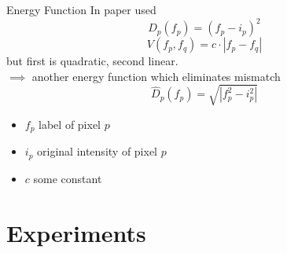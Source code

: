 \documentclass[mathserif]{beamer}
\def\secslide{
    \begin{frame}
        \centering \Huge \secname
    \end{frame}
    \addtocounter{framenumber}{-1}
}
\begin{document}
\begin{frame}{Energy Function}
    In paper used
    \begin{equation}
        D_p(f_p) = (f_p - i_p)^2
    \end{equation}
    \begin{equation}
        V(f_p, f_q) = c\cdot |f_p-f_q| 
    \end{equation}
    but first is quadratic, second linear.\\
    \vspace{0.5cm}
    $\implies$
    another energy function which eliminates mismatch
    \begin{equation}
        \hat D_p(f_p) = \sqrt{|f_p^2 - i_p^2|}
    \end{equation}
    \footnotesize
    \begin{itemize}
        \item[] $f_p$ label of pixel $p$
        \item[] $i_p$ original intensity of pixel $p$
        \item[] $c$ some constant
    \end{itemize}
\end{frame}



\section{Experiments}
\secslide
\end{document}
